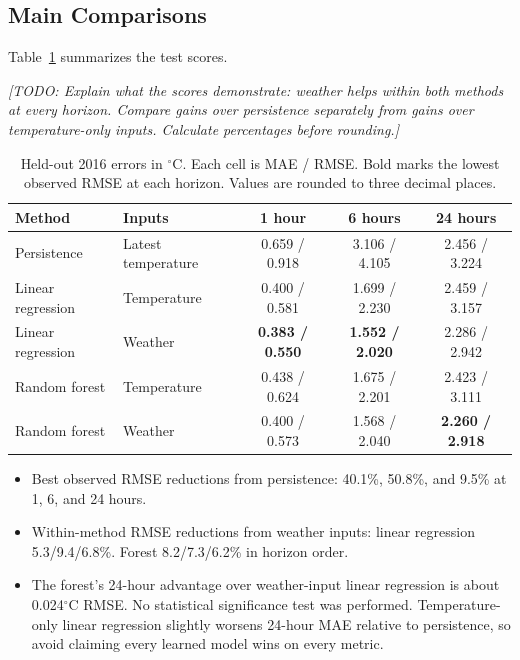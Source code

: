 \documentclass[11pt]{article}
\newcommand{\todo}[1]{\par\smallskip\noindent
  {\color{blue!60!black}\textit{[TODO: #1]}}\par\smallskip}
\newcommand{\degc}{\ensuremath{{}^{\circ}\mathrm{C}}}
\begin{document}
\subsection{Main Comparisons}
Table~\ref{tab:results} summarizes the test scores.
\todo{Explain what the scores demonstrate: weather helps within both
methods at every horizon. Compare gains over persistence separately from
gains over temperature-only inputs. Calculate percentages before rounding.}

\begin{table}[htbp]
\centering
\small
\setlength{\tabcolsep}{5pt}
\caption{Held-out 2016 errors in \degc{}. Each cell is MAE / RMSE.
Bold marks the lowest observed RMSE at each horizon.
Values are rounded to three decimal places.}
\label{tab:results}
\begin{tabular}{llccc}
\toprule
Method & Inputs & 1 hour & 6 hours & 24 hours \\
\midrule
Persistence & Latest temperature & 0.659 / 0.918 & 3.106 / 4.105 & 2.456 / 3.224 \\
Linear regression & Temperature & 0.400 / 0.581 & 1.699 / 2.230 & 2.459 / 3.157 \\
Linear regression & Weather & \textbf{0.383 / 0.550} & \textbf{1.552 / 2.020} & 2.286 / 2.942 \\
Random forest & Temperature & 0.438 / 0.624 & 1.675 / 2.201 & 2.423 / 3.111 \\
Random forest & Weather & 0.400 / 0.573 & 1.568 / 2.040 & \textbf{2.260 / 2.918} \\
\bottomrule
\end{tabular}
\end{table}

\begin{itemize}
  \item Best observed RMSE reductions from persistence: 40.1\%, 50.8\%,
  and 9.5\% at 1, 6, and 24 hours.
  \item Within-method RMSE reductions from weather inputs: linear
  regression 5.3/9.4/6.8\%. Forest 8.2/7.3/6.2\% in horizon order.
  \item The forest's 24-hour advantage over weather-input linear regression
  is about 0.024\degc{} RMSE. No statistical significance test was performed.
  Temperature-only linear regression slightly worsens 24-hour MAE relative
  to persistence, so avoid claiming every learned model wins on every metric.
\end{itemize}
\end{document}
